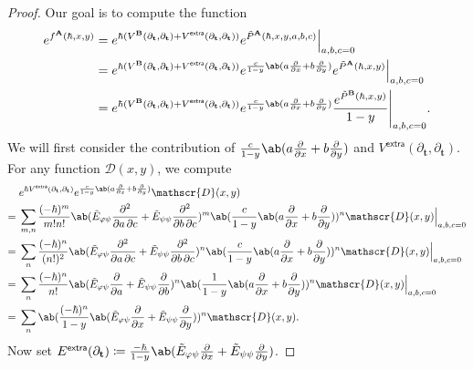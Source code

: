 \documentclass[10pt]{amsart}
\theoremstyle{definition}
\theoremstyle{remark}
\theoremstyle{plain}
\theoremstyle{definition}
\theoremstyle{remark}
\newcommand{\bA}{\mathbf{A}}
\newcommand{\bB}{\mathbf{B}}
\newcommand{\bt}{\mathbf{t}}
\newcommand{\msc}[1]{\mathscr{#1}}
\newcommand{\ms}[1]{\mathsf{#1}}
\newcommand{\1}{\mathbf{1}}
\newcommand{\2}{\mathbf{2}}
\newcommand{\3}{\mathbf{3}}
\newcommand{\extra}{\ms{extra}}
\numberwithin{equation}{section}
\begin{document}
\begin{proof}
    Our goal is to compute the function
    \begin{align*}
        e^{f^{\bA}(\hbar, x, y)} ={}&
        e^{\hbar(V^{\bB}(\partial_{\bt}, \partial_{\bt}) + V^{\extra}(\partial_{\bt}, \partial_{\bt}))} e^{\tilde{P}^{\bA}(\hbar, x, y, a, b, c)}\Big|_{a,b,c=0} \\
        ={}& e^{\hbar(V^{\bB}(\partial_{\bt}, \partial_{\bt})+V^{\extra}(\partial_{\bt}, \partial_{\bt}))} e^{\frac{c}{1-y}\ab(a\pdv{}{x}+b\pdv{}{y})}e^{\tilde{P}^{\bA}(\hbar, x, y)} \Big|_{a,b,c=0} \\
        ={}& e^{\hbar(V^{\bB}(\partial_{\bt}, \partial_{\bt})+V^{\extra}(\partial_{\bt}, \partial_{\bt}))} e^{\frac{c}{1-y}\ab(a\pdv{}{x}+b\pdv{}{y})}\frac{e^{\tilde{P}^{\bB}(\hbar, x, y)}}{1-y} \Bigg|_{a,b,c=0}. 
    \end{align*}
    We will first consider the contribution of $\frac{c}{1-y} \ab(a\pdv{}{x}+b\pdv{}{y})$ and $V^{\extra}(\partial_{\bt}, \partial_{\bt})$. For any function $\msc{D}(x,y)$, we compute
    \begin{align*}
        & e^{\hbar V^{\extra}(\partial_{\bt}, \partial_{\bt})} e^{\frac{c}{1-y}\ab(a\pdv{}{x}+b\pdv{}{y})} \msc{D}(x,y) \\
        ={}& \sum_{m,n} \frac{(-\hbar)^m}{m!n!}  \ab(\tilde{E}_{\varphi\psi}\pdv{}{a,c} + \tilde{E}_{\psi\psi}\pdv{}{b,c})^m \ab(\frac{c}{1-y} \ab(a\pdv{}{x}+b\pdv{}{y}))^n \msc{D}(x,y) \Big|_{a,b,c=0} \\
        ={}& \sum_{n} \frac{(-\hbar)^n}{(n!)^2}  \ab(\tilde{E}_{\varphi\psi}\pdv{}{a,c} + \tilde{E}_{\psi\psi}\pdv{}{b,c})^n \ab(\frac{c}{1-y} \ab(a\pdv{}{x}+b\pdv{}{y}))^n \msc{D}(x,y) \Big|_{a,b,c=0} \\
        ={}& \sum_n \frac{(-\hbar)^n}{n!}\ab(\tilde{E}_{\varphi\psi}\pdv{}{a} + \tilde{E}_{\psi\psi}\pdv{}{b})^n \ab(\frac{1}{1-y} \ab(a\pdv{}{x}+b\pdv{}{y}))^n \msc{D}(x,y) \Big|_{a,b,c=0} \\
        ={}& \sum_n \ab(\frac{(-\hbar)^n}{1-y} \ab(\tilde{E}_{\varphi\psi}\pdv{}{x} + \tilde{E}_{\psi\psi} \pdv{}{y}))^n \msc{D}(x,y).
    \end{align*}
    Now set $E^{\extra}(\partial_{\bt}) \coloneqq \frac{-\hbar}{1-y}\ab(\tilde{E}_{\varphi\psi}\pdv{}{x} + \tilde{E}_{\psi\psi}\pdv{}{y})$.


\end{proof}
\end{document}

